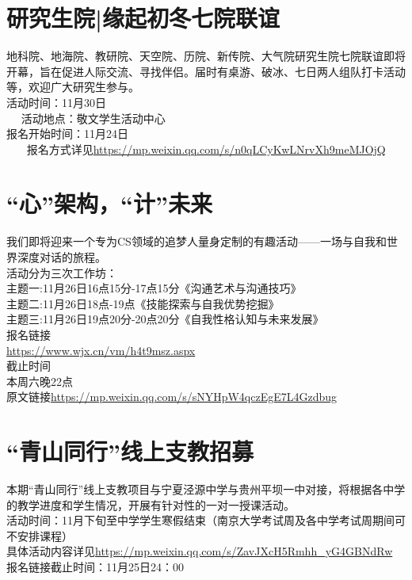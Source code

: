 \documentclass[letterpaper, 12pt]{article}
\begin{document}
\begin{multicols}{2}
\section{研究生院|缘起初冬七院联谊}
地科院、地海院、教研院、天空院、历院、新传院、大气院研究生院七院联谊即将开幕，旨在促进人际交流、寻找伴侣。届时有桌游、破冰、七日两人组队打卡活动等，欢迎广大研究生参与。\\
活动时间：11月30日\\  
活动地点：敬文学生活动中心\\
报名开始时间：11月24日\\   
报名方式详见\url{https://mp.weixin.qq.com/s/n0qLCyKwLNrvXh9meMJOjQ}


\section{“心”架构，“计”未来}
我们即将迎来一个专为CS领域的追梦人量身定制的有趣活动——一场与自我和世界深度对话的旅程。\\
活动分为三次工作坊：\\
主题一:11月26日16点15分-17点15分《沟通艺术与沟通技巧》\\
主题二:11月26日18点-19点《技能探索与自我优势挖掘》\\
主题三:11月26日19点20分-20点20分《自我性格认知与未来发展》\\
报名链接\\
\url{https://www.wjx.cn/vm/h4t9msz.aspx}\\
截止时间\\
本周六晚22点\\
原文链接\url{https://mp.weixin.qq.com/s/sNYHpW4qczEgE7L4Gzdbug}

\section{“青山同行”线上支教招募}
本期“青山同行”线上支教项目与宁夏泾源中学与贵州平坝一中对接，将根据各中学的教学进度和学生情况，开展有针对性的一对一授课活动。\\
活动时间：11月下旬至中学学生寒假结束（南京大学考试周及各中学考试周期间可不安排课程）\\
具体活动内容详见\url{https://mp.weixin.qq.com/s/ZavJXcH5Rmhh_yG4GBNdRw}\\
报名链接截止时间：11月25日24：00\\

\end{multicols}
\end{document}
